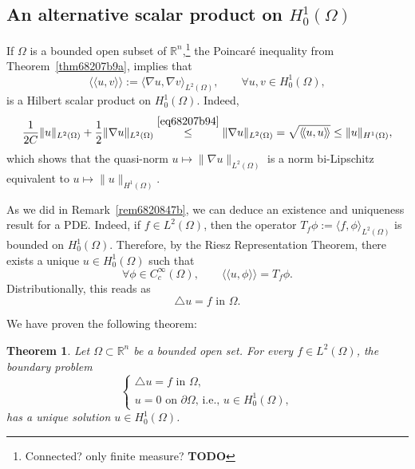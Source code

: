 \documentclass[a4paper,9pt]{amsart}
\newcommand{\R}{\mathbb{R}}	%
\newcommand{\de}{\partial}		%
\newcommand{\laplacian}{\triangle}
\newcommand{\grad}{\nabla}
\newcommand{\llangle}{\langle\!\langle}
\newcommand{\rrangle}{\rangle\!\rangle}
\newcommand{\TODO}{{\bf\color{Red}TODO}}
\theoremstyle{plain}
\newtheorem{theorem}[proposition]{Theorem}
\theoremstyle{definition}
\theoremstyle{remark}
\begin{document}
\subsection{An alternative scalar product on $H^1_0(\Omega)$}\label{subs6821ad68}
If $\Omega$ is a bounded open subset of $\R^n$,\footnote{Connected? only finite measure? \TODO}
the Poincaré inequality from Theorem~\ref{thm68207b9a}, implies that
\begin{equation}\label{eq6821ad6f}
	\llangle u,v \rrangle := \langle \grad u,\grad v \rangle_{L^2(\Omega)},
	\qquad\forall u,v\in H^1_0(\Omega),
\end{equation}
is a Hilbert scalar product on $H^1_0(\Omega)$.
Indeed, 
\begin{equation}
	\frac1{2C} \|u\|_{L^2(\Omega)} + \frac12 \|\grad u\|_{L^2(\Omega)}
	\overset{\eqref{eq68207b94}}\le \|\grad u\|_{L^2(\Omega)}
	= \sqrt{ \llangle u,u \rrangle } \le \|u\|_{H^1(\Omega)} ,
\end{equation}
which shows that the quasi-norm $u\mapsto \|\grad u\|_{L^2(\Omega)}$ is a norm bi-Lipschitz equivalent to $u\mapsto\|u\|_{H^1(\Omega)}$.

As we did in Remark~\ref{rem6820847b}, we can deduce an existence and uniqueness result for a PDE.
Indeed, if $f\in L^2(\Omega)$, then the operator $T_f\phi := \langle f,\phi \rangle_{L^2(\Omega)}$ is bounded on $H^1_0(\Omega)$.
Therefore, by the Riesz Representation Theorem, there exists a unique $u\in H^1_0(\Omega)$ such that
\begin{equation}
	\forall \phi\in C^\infty_c(\Omega),\qquad
	\llangle u,\phi \rrangle = T_f\phi .
\end{equation}
Distributionally, this reads as
\begin{equation}
	\laplacian u = f \text{ in }\Omega.
\end{equation}

We have proven the following theorem:
\begin{theorem}
	Let $\Omega\subset\R^n$ be a bounded open set.
	For every $f\in L^2(\Omega)$, the boundary problem
	\begin{equation}
		\begin{cases}
			\laplacian u = f \text{ in }\Omega, \\
			u= 0\text{ on }\de\Omega\text{, i.e., }u\in H^1_0(\Omega),
		\end{cases}
	\end{equation}
	has a unique solution $u\in H^1_0(\Omega)$.
\end{theorem}
\end{document}
